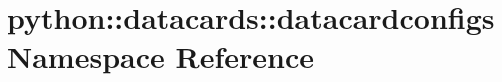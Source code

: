 \hypertarget{namespacepython_1_1datacards_1_1datacardconfigs}{
\section{python::datacards::datacardconfigs Namespace Reference}
\label{namespacepython_1_1datacards_1_1datacardconfigs}
}
